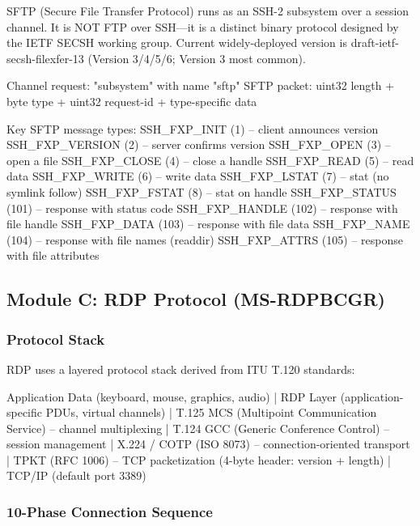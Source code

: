 \documentclass[11pt,letterpaper]{article}
\begin{document}
SFTP (Secure File Transfer Protocol) runs as an SSH-2 subsystem over a session channel. It is NOT FTP over SSH---it is a distinct binary protocol designed by the IETF SECSH working group. Current widely-deployed version is draft-ietf-secsh-filexfer-13 (Version 3/4/5/6; Version 3 most common).

\begin{asciibox}
Channel request: "subsystem" with name "sftp"
SFTP packet: uint32 length + byte type + uint32 request-id + type-specific data

Key SFTP message types:
  SSH_FXP_INIT (1)       -- client announces version
  SSH_FXP_VERSION (2)    -- server confirms version
  SSH_FXP_OPEN (3)       -- open a file
  SSH_FXP_CLOSE (4)      -- close a handle
  SSH_FXP_READ (5)       -- read data
  SSH_FXP_WRITE (6)      -- write data
  SSH_FXP_LSTAT (7)      -- stat (no symlink follow)
  SSH_FXP_FSTAT (8)      -- stat on handle
  SSH_FXP_STATUS (101)   -- response with status code
  SSH_FXP_HANDLE (102)   -- response with file handle
  SSH_FXP_DATA (103)     -- response with file data
  SSH_FXP_NAME (104)     -- response with file names (readdir)
  SSH_FXP_ATTRS (105)    -- response with file attributes
\end{asciibox}

\subsection{Module C: RDP Protocol (MS-RDPBCGR)}

\subsubsection{Protocol Stack}

RDP uses a layered protocol stack derived from ITU T.120 standards:
\begin{asciibox}
Application Data (keyboard, mouse, graphics, audio)
     |
RDP Layer (application-specific PDUs, virtual channels)
     |
T.125 MCS (Multipoint Communication Service) -- channel multiplexing
     |
T.124 GCC (Generic Conference Control) -- session management
     |
X.224 / COTP (ISO 8073) -- connection-oriented transport
     |
TPKT (RFC 1006) -- TCP packetization (4-byte header: version + length)
     |
TCP/IP (default port 3389)
\end{asciibox}

\subsubsection{10-Phase Connection Sequence}
\end{document}
